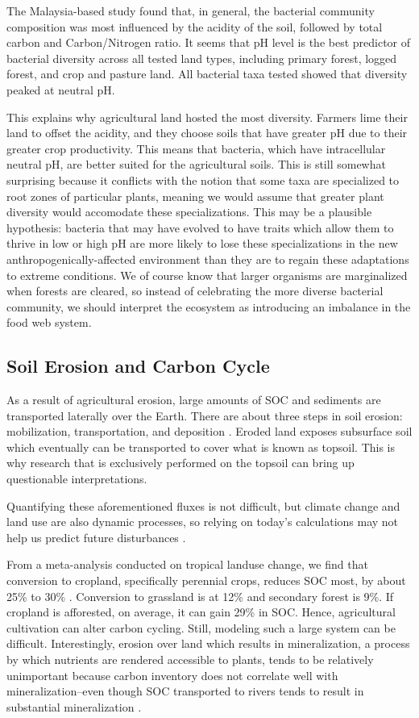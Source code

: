 The Malaysia-based study found that, in general, the bacterial community composition was most influenced by the acidity of the soil, followed by total carbon and Carbon/Nitrogen ratio. It seems that pH level is the best predictor of bacterial diversity across all tested land types, including primary forest, logged forest, and crop and pasture land. All bacterial taxa tested showed that diversity peaked at neutral pH. 

This explains why agricultural land hosted the most diversity. Farmers lime their land to offset the acidity, and they choose soils that have greater pH due to their greater crop productivity. This means that bacteria, which have intracellular neutral pH, are better suited for the agricultural soils. This is still somewhat surprising because it conflicts with the notion that some taxa are specialized to root zones of particular plants, meaning we would assume that greater plant diversity would accomodate these specializations. This may be a plausible hypothesis: bacteria that may have evolved to have traits which allow them to thrive in low or high pH are more likely to lose these specializations in the new anthropogenically-affected environment than they are to regain these adaptations to extreme conditions. We of course know that larger organisms are marginalized when forests are cleared, so instead of celebrating the more diverse bacterial community, we should interpret the ecosystem as introducing an imbalance in the food web system.

\subsection{Soil Erosion and Carbon Cycle}

As a result of agricultural erosion, large amounts of SOC and sediments are transported laterally over the Earth. There are about three steps in soil erosion: mobilization, transportation, and deposition \citep{quinton2010impact}. Eroded land exposes subsurface soil which eventually can be transported to cover what is known as topsoil. This is why research that is exclusively performed on the topsoil can bring up questionable interpretations. 

Quantifying these aforementioned fluxes is not difficult, but climate change and land use are also dynamic processes, so relying on today's calculations may not help us predict future disturbances \citep{heimann2008terrestrial}.

From a meta-analysis conducted on tropical landuse change, we find that conversion to cropland, specifically perennial crops, reduces SOC most, by about 25\% to 30\% \citep{don2011impact}. Conversion to grassland is at 12\% and secondary forest is 9\%. If cropland is afforested, on average, it can gain 29\% in SOC. Hence, agricultural cultivation can alter carbon cycling. Still, modeling such a large system can be difficult.
Interestingly, erosion over land which results in mineralization, a process by which nutrients are rendered accessible to plants, tends to be relatively unimportant because carbon inventory does not correlate well with mineralization--even though SOC transported to rivers tends to result in substantial mineralization \citep{cole2007plumbing}. 

